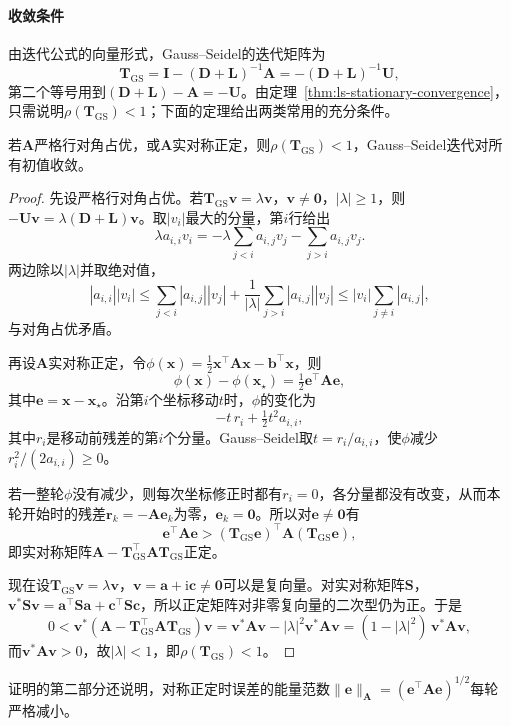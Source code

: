 \paragraph{收敛条件}
由迭代公式的向量形式，Gauss--Seidel的迭代矩阵为
\begin{equation}
\bm T_{\mathrm{GS}}=\bm I-(\bm D+\bm L)^{-1}\bm A=-(\bm D+\bm L)^{-1}\bm U ,
 \label{eq:ls-gauss-seidel-iteration-matrix}
\end{equation}
第二个等号用到$(\bm D+\bm L)-\bm A=-\bm U$。由定理~\ref{thm:ls-stationary-convergence}，只需说明$\rho(\bm T_{\mathrm{GS}})<1$；下面的定理给出两类常用的充分条件。
\begin{theorem}
\label{thm:ls-gauss-seidel-convergence}
若$\bm A$严格行对角占优，或$\bm A$实对称正定，则$\rho(\bm T_{\mathrm{GS}})<1$，Gauss--Seidel迭代对所有初值收敛。
\end{theorem}
\begin{proof}
先设严格行对角占优。若$\bm T_{\mathrm{GS}}\bm v=\lambda\bm v$，$\bm v\neq\bm 0$，$|\lambda|\geq1$，则$-\bm U\bm v=\lambda(\bm D+\bm L)\bm v$。取$|v_i|$最大的分量，第$i$行给出
\[
 \lambda a_{i,i}v_i=-\lambda\sum_{j<i}a_{i,j}v_j-\sum_{j>i}a_{i,j}v_j .
\]
两边除以$|\lambda|$并取绝对值，
\[
|a_{i,i}||v_i|\leq\sum_{j<i}|a_{i,j}||v_j|+\frac{1}{|\lambda|}\sum_{j>i}|a_{i,j}||v_j|
\leq|v_i|\sum_{j\neq i}|a_{i,j}|,
\]
与对角占优矛盾。

再设$\bm A$实对称正定，令$\phi(\bm x)=\tfrac12\bm x^\top\bm A\bm x-\bm b^\top\bm x$，则
\[
 \phi(\bm x)-\phi(\bm x_\star)=\tfrac12\bm e^\top\bm A\bm e ,
\]
其中$\bm e=\bm x-\bm x_\star$。沿第$i$个坐标移动$t$时，$\phi$的变化为
\[
 -t\,r_i+\tfrac12t^2a_{i,i} ,
\]
其中$r_i$是移动前残差的第$i$个分量。Gauss--Seidel取$t=r_i/a_{i,i}$，使$\phi$减少$r_i^2/(2a_{i,i})\geq0$。

若一整轮$\phi$没有减少，则每次坐标修正时都有$r_i=0$，各分量都没有改变，从而本轮开始时的残差$\bm r_k=-\bm A\bm e_k$为零，$\bm e_k=\bm0$。所以对$\bm e\neq\bm 0$有
\[
\bm e^\top\bm A\bm e>(\bm T_{\mathrm{GS}}\bm e)^\top\bm A(\bm T_{\mathrm{GS}}\bm e),
\]
即实对称矩阵$\bm A-\bm T_{\mathrm{GS}}^\top\bm A\bm T_{\mathrm{GS}}$正定。

现在设$\bm T_{\mathrm{GS}}\bm v=\lambda\bm v$，$\bm v=\bm a+\mathrm i\bm c\neq\bm 0$可以是复向量。对实对称矩阵$\bm S$，$\bm v^*\bm S\bm v=\bm a^\top\bm S\bm a+\bm c^\top\bm S\bm c$，所以正定矩阵对非零复向量的二次型仍为正。于是
\[
0<\bm v^*(\bm A-\bm T_{\mathrm{GS}}^\top\bm A\bm T_{\mathrm{GS}})\bm v
=\bm v^*\bm A\bm v-|\lambda|^2\bm v^*\bm A\bm v
=(1-|\lambda|^2)\,\bm v^*\bm A\bm v ,
\]
而$\bm v^*\bm A\bm v>0$，故$|\lambda|<1$，即$\rho(\bm T_{\mathrm{GS}})<1$。
\end{proof}
证明的第二部分还说明，对称正定时误差的能量范数$\lVert\bm e\rVert_{\bm A}=(\bm e^\top\bm A\bm e)^{1/2}$每轮严格减小。

